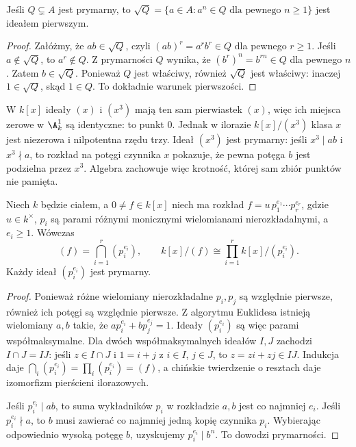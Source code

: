 \begin{stwierdzenie}
Jeśli $Q\subsetneq A$ jest prymarny, to
$\sqrt Q=\{a\in A:a^n\in Q\text{ dla pewnego }n\ge1\}$
jest ideałem pierwszym.
\end{stwierdzenie}
\begin{proof}
Załóżmy, że $ab\in\sqrt Q$, czyli
$(ab)^r=a^rb^r\in Q$ dla pewnego $r\ge1$.
Jeśli $a\notin\sqrt Q$, to $a^r\notin Q$.
Z prymarności $Q$ wynika, że
$(b^r)^n=b^{rn}\in Q$ dla pewnego $n$.
Zatem $b\in\sqrt Q$. Ponieważ $Q$ jest właściwy,
również $\sqrt Q$ jest właściwy: inaczej
$1\in\sqrt Q$, skąd $1\in Q$. To dokładnie
warunek pierwszości.
\end{proof}

\begin{przyklad}
W $k[x]$ ideały $(x)$ i $(x^3)$ mają ten sam
pierwiastek $(x)$, więc ich miejsca zerowe
w $\A^1_k$ są identyczne: to punkt $0$.
Jednak w ilorazie $k[x]/(x^3)$ klasa $x$
jest niezerowa i nilpotentna rzędu trzy.
Ideał $(x^3)$ jest prymarny: jeśli $x^3\mid ab$
i $x^3\nmid a$, to rozkład na potęgi czynnika
$x$ pokazuje, że pewna potęga $b$ jest podzielna
przez $x^3$. Algebra zachowuje więc krotność,
której sam zbiór punktów nie pamięta.
\end{przyklad}

\begin{twierdzenie}
\label{tw:primary-kx}
Niech $k$ będzie ciałem, a $0\ne f\in k[x]$
niech ma rozkład
$f=u\,p_1^{e_1}\cdots p_r^{e_r}$,
gdzie $u\in k^\times$, $p_i$ są parami
różnymi monicznymi wielomianami nierozkładalnymi,
a $e_i\ge1$. Wówczas
\[
 (f)=\bigcap_{i=1}^r(p_i^{e_i}),\qquad
 k[x]/(f)\cong\prod_{i=1}^r k[x]/(p_i^{e_i}).
\]
Każdy ideał $(p_i^{e_i})$ jest prymarny.
\end{twierdzenie}
\begin{proof}
Ponieważ różne wielomiany nierozkładalne $p_i,p_j$
są względnie pierwsze, również ich potęgi są
względnie pierwsze. Z algorytmu Euklidesa
istnieją wielomiany $a,b$ takie, że
$ap_i^{e_i}+bp_j^{e_j}=1$.
Ideały $(p_i^{e_i})$ są więc parami współmaksymalne.
Dla dwóch współmaksymalnych ideałów $I,J$
zachodzi $I\cap J=IJ$: jeśli $z\in I\cap J$
i $1=i+j$ z $i\in I$, $j\in J$, to
$z=zi+zj\in IJ$. Indukcja daje
$\bigcap_i(p_i^{e_i})=\prod_i(p_i^{e_i})=(f)$,
a chińskie twierdzenie o resztach daje izomorfizm
pierścieni ilorazowych.

Jeśli $p_i^{e_i}\mid ab$, to suma wykładników
$p_i$ w rozkładzie $a,b$ jest co najmniej $e_i$.
Jeśli $p_i^{e_i}\nmid a$, to $b$ musi zawierać
co najmniej jedną kopię czynnika $p_i$.
Wybierając odpowiednio wysoką potęgę $b$,
uzyskujemy $p_i^{e_i}\mid b^n$.
To dowodzi prymarności.
\end{proof}

